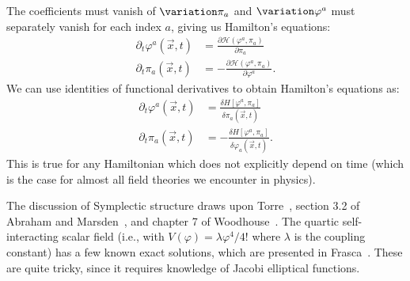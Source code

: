 The coefficients must vanish of $\variation\pi_{a}$ and
$\variation\varphi^{a}$ must separately vanish for each index $a$,
giving us Hamilton's equations:
\begin{subequations}
\begin{align}
\partial_{t}\varphi^{a}(\vec{x},t)&=\frac{\partial\mathcal{H}(\varphi^{a},\pi_{a})}{\partial\pi_{a}}\\
\partial_{t}\pi_{a}(\vec{x},t)&=-\frac{\partial\mathcal{H}(\varphi^{a},\pi_{a})}{\partial\varphi^{a}}.
\end{align}
\end{subequations}
We can use identities of functional derivatives to obtain Hamilton's
equations as:
\begin{subequations}
\begin{align}
\partial_{t}\varphi^{a}(\vec{x},t)&=\frac{\delta H[\varphi^{a},\pi_{a}]}{\delta\pi_{a}(\vec{x},t)}\\
\partial_{t}\pi_{a}(\vec{x},t)&=-\frac{\delta H[\varphi^{a},\pi_{a}]}{\delta\varphi_{a}(\vec{x},t)}.
\end{align}
\end{subequations}
This is true for any Hamiltonian which does not explicitly depend on
time (which is the case for almost all field theories we encounter in physics).

The discussion of Symplectic structure draws upon
Torre~\cite{Torre:2022}, section 3.2 of Abraham and Marsden~\cite{Abraham:1978},
and chapter 7 of Woodhouse~\cite{Woodhouse:1992de}.
The quartic self-interacting scalar field (i.e., with
$V(\varphi)=\lambda\varphi^{4}/4!$ where $\lambda$ is the coupling
constant) has a few known exact solutions, which are presented in
Frasca~\cite{Frasca:2009bc}. These are quite tricky, since it requires
knowledge of Jacobi elliptical functions.
